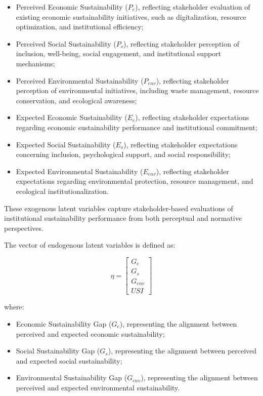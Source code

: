 \documentclass[11pt,a4paper]{article}
\begin{document}
\begin{itemize}
\item Perceived Economic Sustainability ($P_e$), reflecting stakeholder evaluation of existing economic sustainability initiatives, such as digitalization, resource optimization, and institutional efficiency;
\item Perceived Social Sustainability ($P_s$), reflecting stakeholder perception of inclusion, well-being, social engagement, and institutional support mechanisms;
\item Perceived Environmental Sustainability ($P_{env}$), reflecting stakeholder perception of environmental initiatives, including waste management, resource conservation, and ecological awareness;
\item Expected Economic Sustainability ($E_e$), reflecting stakeholder expectations regarding economic sustainability performance and institutional commitment;
\item Expected Social Sustainability ($E_s$), reflecting stakeholder expectations concerning inclusion, psychological support, and social responsibility;
\item Expected Environmental Sustainability ($E_{env}$), reflecting stakeholder expectations regarding environmental protection, resource management, and ecological institutionalization.
\end{itemize}

These exogenous latent variables capture stakeholder-based evaluations of institutional sustainability performance from both perceptual and normative perspectives.

The vector of endogenous latent variables is defined as:

\begin{equation}
\eta =
\begin{bmatrix}
G_e \\
G_s \\
G_{env} \\
USI
\end{bmatrix}
\end{equation}

where:

\begin{itemize}
\item Economic Sustainability Gap ($G_e$), representing the alignment between perceived and expected economic sustainability;
\item Social Sustainability Gap ($G_s$), representing the alignment between perceived and expected social sustainability;
\item Environmental Sustainability Gap ($G_{env}$), representing the alignment between perceived and expected environmental sustainability.
\end{itemize}
\end{document}
